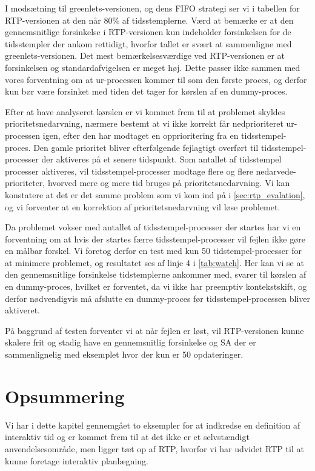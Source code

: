 I modsætning til greenlets-versionen, og dens FIFO strategi ser vi i tabellen for RTP-versionen at den  når 80\% af tidsstemplerne. Værd at bemærke er at den gennemsnitlige forsinkelse i RTP-versionen kun indeholder forsinkelsen for de tidsstempler der ankom rettidigt, hvorfor tallet er svært at sammenligne med greenlets-versionen. Det mest bemærkelsesværdige ved RTP-versionen er at forsinkelsen og standardafvigelsen er meget høj. Dette passer ikke sammen med vores forventning om at ur-processen kommer til som den første proces, og derfor kun bør være forsinket med tiden det tager for kørslen af en  dummy-proces.

Efter at have analyseret kørslen er vi kommet frem til at problemet skyldes prioritetsnedarvning, nærmere bestemt at vi ikke korrekt får nedprioriteret ur-processen igen, efter den har modtaget en opprioritering fra en tidsstempel-proces. Den gamle prioritet bliver efterfølgende fejlagtigt overført til tidsstempel-processer der aktiveres på et senere tidspunkt. Som antallet af tidsstempel processer aktiveres, vil tidsstempel-processer modtage flere og flere nedarvede-prioriteter, hvorved mere og mere tid bruges på prioritetsnedarvning. Vi kan konstatere at det er det samme problem som vi kom ind på i \cref{sec:rtp_evalation}, og vi forventer at en korrektion af prioritetsnedarvning vil løse problemet. 

Da problemet vokser med antallet af tidsstempel-processer der startes har vi en forventning om at hvis der startes færre tidsstempel-processer vil fejlen ikke gøre en målbar forskel. Vi foretog derfor en test med kun 50 tidstempel-processer for at minimere problemet, og resultatet ses af linje 4 i \cref{tab:watch}. Her kan vi se at  den gennemsnitlige forsinkelse tidstemplerne ankommer med, svarer til kørslen af en dummy-proces, hvilket er forventet, da vi ikke har preemptiv kontekstskift, og derfor nødvendigvis må afslutte en dummy-proces før tidsstempel-processen bliver aktiveret. 

På baggrund af testen forventer vi at når fejlen er løst, vil RTP-versionen kunne skalere frit og stadig have en gennemsnitlig forsinkelse og SA der er sammenlignelig med eksemplet hvor der kun er 50 opdateringer.
\section{Opsummering}

Vi har i dette kapitel gennemgået to eksempler for at indkredse en definition af interaktiv tid og er kommet frem til at det ikke er et selvstændigt anvendelsesområde, men ligger tæt op af RTP, hvorfor vi har udvidet RTP til at kunne foretage interaktiv planlægning.


